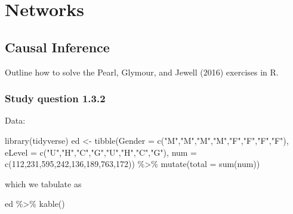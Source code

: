 \documentclass[
  letterpaper,
]{book}
\newenvironment{Shaded}{\begin{snugshade}}{\end{snugshade}}
\newcommand{\AttributeTok}[1]{\textcolor[rgb]{0.40,0.45,0.13}{#1}}
\newcommand{\DecValTok}[1]{\textcolor[rgb]{0.68,0.00,0.00}{#1}}
\newcommand{\FunctionTok}[1]{\textcolor[rgb]{0.28,0.35,0.67}{#1}}
\newcommand{\NormalTok}[1]{\textcolor[rgb]{0.00,0.23,0.31}{#1}}
\newcommand{\OtherTok}[1]{\textcolor[rgb]{0.00,0.23,0.31}{#1}}
\newcommand{\SpecialCharTok}[1]{\textcolor[rgb]{0.37,0.37,0.37}{#1}}
\newcommand{\StringTok}[1]{\textcolor[rgb]{0.13,0.47,0.30}{#1}}
\begin{document}
\part{Networks}

\hypertarget{causal-inference}{%
\chapter{Causal Inference}\label{causal-inference}}

Outline how to solve the Pearl, Glymour, and Jewell (2016) exercises in
R.

\hypertarget{study-question-1.3.2}{%
\section{Study question 1.3.2}\label{study-question-1.3.2}}

Data:

\begin{Shaded}
\begin{Highlighting}[]
\FunctionTok{library}\NormalTok{(tidyverse)}
\NormalTok{ed }\OtherTok{\textless{}{-}} \FunctionTok{tibble}\NormalTok{(}\AttributeTok{Gender =} \FunctionTok{c}\NormalTok{(}\StringTok{"M"}\NormalTok{,}\StringTok{"M"}\NormalTok{,}\StringTok{"M"}\NormalTok{,}\StringTok{"M"}\NormalTok{,}\StringTok{"F"}\NormalTok{,}\StringTok{"F"}\NormalTok{,}\StringTok{"F"}\NormalTok{,}\StringTok{"F"}\NormalTok{),}
             \AttributeTok{eLevel =} \FunctionTok{c}\NormalTok{(}\StringTok{"U"}\NormalTok{,}\StringTok{"H"}\NormalTok{,}\StringTok{"C"}\NormalTok{,}\StringTok{"G"}\NormalTok{,}\StringTok{"U"}\NormalTok{,}\StringTok{"H"}\NormalTok{,}\StringTok{"C"}\NormalTok{,}\StringTok{"G"}\NormalTok{),}
             \AttributeTok{num    =} \FunctionTok{c}\NormalTok{(}\DecValTok{112}\NormalTok{,}\DecValTok{231}\NormalTok{,}\DecValTok{595}\NormalTok{,}\DecValTok{242}\NormalTok{,}\DecValTok{136}\NormalTok{,}\DecValTok{189}\NormalTok{,}\DecValTok{763}\NormalTok{,}\DecValTok{172}\NormalTok{)) }\SpecialCharTok{\%\textgreater{}\%}
  \FunctionTok{mutate}\NormalTok{(}\AttributeTok{total =} \FunctionTok{sum}\NormalTok{(num))}
\end{Highlighting}
\end{Shaded}

which we tabulate as

\begin{Shaded}
\begin{Highlighting}[]
\NormalTok{ed }\SpecialCharTok{\%\textgreater{}\%}
  \FunctionTok{kable}\NormalTok{()}
\end{Highlighting}
\end{Shaded}
\end{document}
